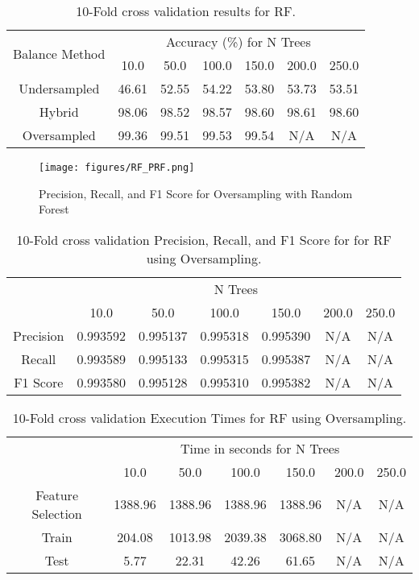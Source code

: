 \documentclass[./AutomatedMK.tex]{subfiles}
\begin{document}
\begin{table*}
\centering
\caption{10-Fold cross validation results for RF.}
\label{tab:RF}
\begin{tabular}{|c|c|c|c|c|c|c|}
\hline
\multirow{2}{*}{Balance Method} & \multicolumn{6}{c|}{Accuracy (\%) for N Trees} \\ 
  &   10.0 &   50.0 &   100.0 &   150.0 &   200.0 &   250.0 \\ \hline
 Undersampled &  46.61 &  52.55 &   54.22 &   53.80 &   53.73 &   53.51 \\ \hline
 Hybrid       &  98.06 &  98.52 &   98.57 &   98.60 &   98.61 &   98.60 \\ \hline
 Oversampled  &  99.36 &  99.51 &   99.53 &   99.54 &  N/A       &   N/A      \\ \hline
\end{tabular}
\end{table*}

        \begin{figure}
            \centering
            \texttt{[image: figures/RF\_PRF.png]}
            \caption{Precision, Recall, and F1 Score for Oversampling with Random Forest}
            \label{fig:RFPRF}
        \end{figure}

\begin{table*}
\centering
\caption{10-Fold cross validation Precision, Recall, and F1 Score for for RF using Oversampling.}
\label{tab:PRFRF}
\begin{tabular}{|c|c|c|c|c|c|c|}
\hline
\multirow{2}{*}{} & \multicolumn{6}{c|}{N Trees} \\ 
  &     10.0 &     50.0 &    100.0 &    150.0 &    200.0 &    250.0  \\ \hline
 Precision & 0.993592 & 0.995137 & 0.995318 & 0.995390 & N/A & N/A \\ \hline
 Recall    & 0.993589 & 0.995133 & 0.995315 & 0.995387 & N/A & N/A \\ \hline
 F1 Score  & 0.993580 & 0.995128 & 0.995310 & 0.995382 & N/A & N/A \\ \hline
\end{tabular}
\end{table*}

\begin{table*}
\centering
\caption{10-Fold cross validation Execution Times for RF using Oversampling.}
\label{tab:RFT}
\begin{tabular}{|c|c|c|c|c|c|c|}
\hline
\multirow{2}{*}{} & \multicolumn{6}{c|}{Time in seconds for N Trees} \\ 
           &   10.0 &   50.0 &   100.0 &   150.0 &   200.0 &   250.0 \\ \hline
 Feature Selection & 1388.96 & 1388.96 & 1388.96 & 1388.96  &    N/A     &    N/A\\ \hline
 Train             &  204.08 & 1013.98 & 2039.38 & 3068.80 &    N/A     &    N/A \\ \hline
 Test              &    5.77 &   22.31 &   42.26 &   61.65 &    N/A     &    N/A     \\ \hline
\end{tabular}
\end{table*}
\end{document}
